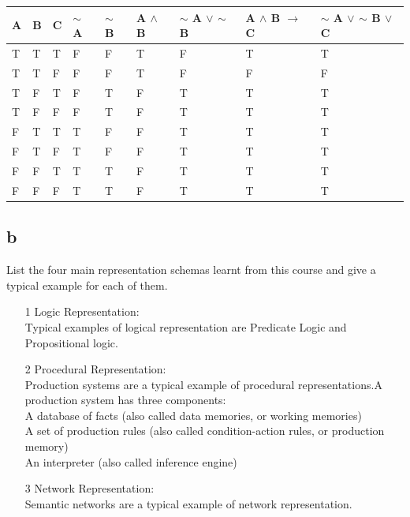 \documentclass[12pt,a4paper]{article}
\begin{document}
{			
				
	
			\begin{tabular} {|l|l|l||l|l|l||l|l||l|}
				\hline
				\hline
				A&B&C& $\mathord{\sim}$  A&$\mathord{\sim}$ B& A $\wedge$ B& $\mathord{\sim}$ A $\lor$ $\mathord{\sim}$ B& A $\wedge$ B $\rightarrow$ C& $\mathord{\sim}$ A $\lor$ $\mathord{\sim}$ B $\lor$ C \\
				\hline
				\hline
			T&T&T&F&F&T&F&T&T \\
			
			T&T&F&F&F&T&F&F&F \\
			T&F&T&F&T&F&T&T&T \\
			T&F&F&F&T&F&T&T&T \\
			F&T&T&T&F&F&T&T&T \\
			F&T&F&T&F&F&T&T&T \\
			F&F&T&T&T&F&T&T&T \\
			F&F&F&T&T&F&T&T&T\\
			\hline
				
			\end{tabular}
			
	
		
		
	\newpage
			
			
	\subsection{b}
		List the four main representation schemas learnt from this course and give a typical 	example for each of them.
		\begin{itemize}
			
		\item[1] Logic Representation:\\
		Typical examples of logical representation are Predicate Logic and Propositional logic.
		
		
		\item[2] Procedural Representation:\\
		Production systems are a typical example of procedural representations.A production system has three components:\\
		A database of facts (also called data memories, or working memories)\\	
		A set of production rules (also called condition-action rules, or production memory)\\	
		An interpreter (also called inference engine)
		
		\item[3] Network Representation:\\
		Semantic networks are a typical example of network representation.
		

\end{itemize}}
\end{document}
